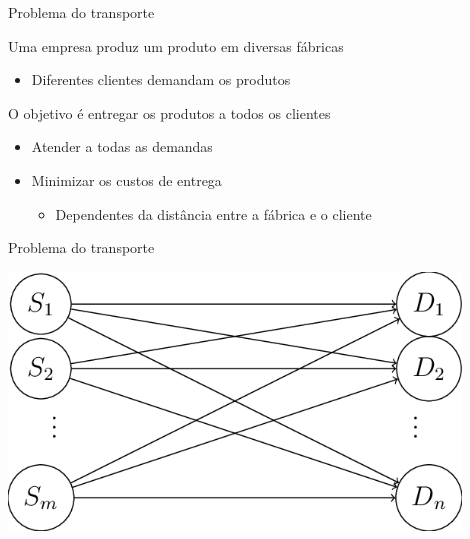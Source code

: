 \documentclass[compress,mathserif]{beamer}
\begin{document}
\begin{frame}{Problema do transporte}

Uma empresa produz um produto em diversas fábricas \href{http://www.producao.ufrgs.br/arquivos/disciplinas/382_winston_cap_7_transportation.pdf}{}
\begin{itemize}
    \item Diferentes clientes demandam os produtos
\end{itemize}
 
\vspace{0.5cm}
 
O objetivo é entregar os produtos a todos os clientes
\begin{itemize}
    \item Atender a todas as demandas
    \item Minimizar os custos de entrega
    \begin{itemize}
        \item Dependentes da distância entre a fábrica e o cliente
    \end{itemize}
\end{itemize}
\end{frame}


\begin{frame}{Problema do transporte}

\vspace{1cm}
\centering \includegraphics[width=0.9\textwidth]{images/transporte.png}

\end{frame}

\end{document}
